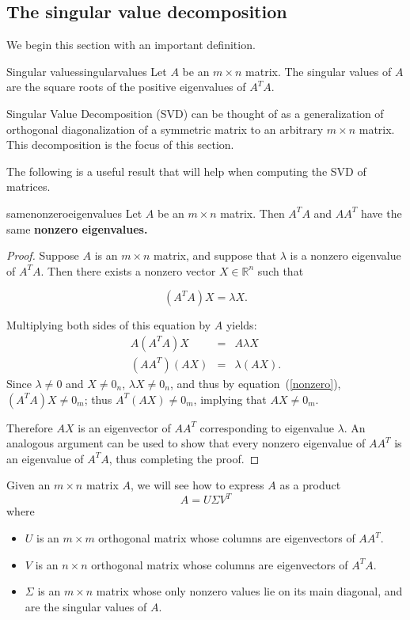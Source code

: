 \subsection{The singular value decomposition}

We begin this section with an important definition.

\begin{definition}{Singular values}{singularvalues}
Let $A$ be an $m\times n$ matrix. The singular values of $A$ are the square roots of the positive
eigenvalues of $A^TA$.
\end{definition}

Singular Value Decomposition (SVD) can be thought of as 
a generalization of orthogonal diagonalization of a symmetric matrix
to an arbitrary $m\times n$ matrix. This decomposition is the focus of this section. 

The following is a useful result that will help when computing the SVD of matrices.

\begin{proposition}{}{samenonzeroeigenvalues}
Let $A$ be an $m \times n$ matrix. Then $A^TA$ and $AA^T$ have the same \bf{nonzero} eigenvalues.
\end{proposition}

\begin{proof}
Suppose $A$ is an $m\times n$ matrix, and suppose that  $\lambda$ is a nonzero eigenvalue of $A^TA$.
Then there exists a nonzero vector $X\in \mathbb{R}^n$ such that

\begin{equation}\label{nonzero}
(A^TA)X=\lambda X.
\end{equation}

Multiplying both sides of this equation by $A$ yields:
\begin{eqnarray*}
A(A^TA)X & = & A\lambda X\\
(AA^T)(AX) & = & \lambda (AX).
\end{eqnarray*}
Since $\lambda\neq 0$ and $X\neq 0_n$, $\lambda X\neq 0_n$,
and thus by equation~(\ref{nonzero}),
$(A^TA)X\neq 0_m$; thus $A^T(AX)\neq 0_m$, 
implying that $AX\neq 0_m$.

Therefore $AX$ is an eigenvector of $AA^T$ corresponding to eigenvalue
$\lambda$.  An analogous argument can be used to show that every
nonzero eigenvalue of $AA^T$ is an eigenvalue of $A^TA$, thus
completing the proof.
\end{proof}

Given an $m\times n$ matrix $A$, we will see how to express $A$ as a product
\[ A=U\Sigma V^T\]
where
\begin{itemize}
\item $U$ is an $m\times m$ orthogonal matrix whose columns are
eigenvectors of $AA^T$.
\item $V$ is an $n\times n$ orthogonal matrix whose columns are
eigenvectors of $A^TA$.
\item $\Sigma$ is an $m\times n$ matrix whose only nonzero values
lie on its main diagonal, and are the singular values of $A$.
\end{itemize}

